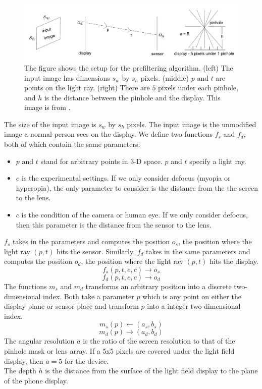 \begin{figure}[ht]
  \centering
  \includegraphics[width=5.0in]{chapters/chapter4/images/Prefilter.png}
  \caption{The figure shows the setup for the prefiltering algorithm. (left) The input image has dimensions $s_w$ by $s_h$ pixels. (middle) $p$ and $t$ are points on the light ray. (right) There are $5$ pixels under each pinhole, and $h$ is the distance between the pinhole and the display. This image is from \cite{Wu:EECS-2016-67}.}
  \label{fig:fr}
\end{figure}

The size of the input image is $s_w$ by $s_h$ pixels. The input image is the unmodified image a normal person sees on the display.
We define two functions $f_s$ and $f_d$, both of which contain the same parameters:
\begin{itemize}
\item $p$ and $t$ stand for arbitrary points in 3-D space. $p$ and $t$ specify a light ray.

\item $e$ is the experimental settings. If we only consider defocus (myopia or hyperopia), the only parameter to consider is the distance from the the screen to the lens.

\item $c$ is the condition of the camera or human eye. If we only consider defocus, then this parameter is the distance from the sensor to the lens.

\end{itemize}

$f_s$ takes in the parameters and computes the position $o_s$, the position where the light ray $(p,t)$ hits the sensor. Similarly, $f_d$ takes in the same parameters and computes the position $o_d$, the position where the light ray $(p, t)$ hits the display. \\
$$f_s(p, t, e, c) \rightarrow o_s$$
$$f_d(p, t, e, c) \rightarrow o_d$$
The functions $m_s$ and $m_d$ transforms an arbitrary position into a discrete two-dimensional index. Both take a parameter $p$ which is any point on either the display plane or sensor place and transform $p$ into a integer two-dimensional index. 
$$m_s(p) \leftarrow (a_s, b_s)$$
$$m_d(p) \rightarrow (a_d, b_d)$$
The angular resolution $a$ is the ratio of the screen resolution to that of the pinhole mask or lens array. If a 5x5 pixels are covered under the light field display, then $a = 5$ for the device.\\
The depth $h$ is the distance from the surface of the light field display to the plane of the phone display.

